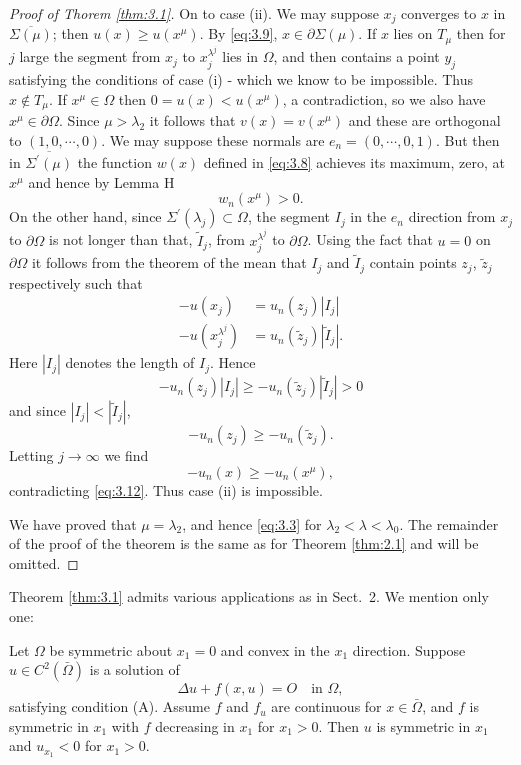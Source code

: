 \begin{proof}[Proof of Thorem \ref{thm:3.1}]
  On to case (ii). We may suppose $x_j$ converges to $x$ in $\overline{\Sigma(\mu)}$; then $u(x) \geq  u(x^{\mu})$. By \eqref{eq:3.9}, $x\in\partial\Sigma(\mu)$. If $x$ lies on $T_{\mu}$ then for $j$ large the segment from $x_j$ to $x_j^{\lambda^j}$ lies in $\Omega$, and then contains a point $y_j$ satisfying the conditions of case (i) - which we know to be impossible. Thus $x\notin T_{\mu}$. If $x^{\mu}\in\Omega$ then $0 = u(x)<u(x^{\mu})$, a contradiction, so we also have $x^{\mu}\in\partial\Omega$. Since $\mu>\lambda_2$ it follows that $v(x)= v(x^{\mu})$ and these are orthogonal to $(1, 0, \cdots, 0)$. We may suppose these normals are $e_n = (0,\cdots ,0, 1)$. But then in $\overline{\Sigma^{\prime}(\mu)}$ the function $w(x)$ defined in \eqref{eq:3.8} achieves its maximum, zero, at $x^{\mu}$ and hence by Lemma H
  \begin{equation}\label{eq:3.12}
    w_n(x^{\mu})>0.
  \end{equation}
  On the other hand, since $\Sigma^{\prime}(\lambda_j)\subset\Omega$, the segment $I_j$ in the $e_n$ direction from $x_j$ to $\partial\Omega$ is not longer than that, $\tilde{I}_j$, from $x_j^{\lambda^j}$ to $\partial\Omega$. Using the fact that $u = 0$ on $\partial\Omega$ it follows from the theorem of the mean that $I_j$ and $\tilde{I}_j$ contain points $z_j$, $\tilde{z}_j$ respectively such that
  \[ \begin{aligned}
    -u(x_j) &= u_n(z_j)|I_j|\\
    -u(x_j^{\lambda^j}) &= u_n(\tilde{z}_j)|\tilde{I}_j|.
  \end{aligned} \]
  Here $|I_j|$ denotes the length of $I_j$. Hence
  \[-u_n(z_j)|I_j|\geq  -u_n(\tilde{z}_j)|\tilde{I}_j| >0\]
  and since $|I_j| < |\tilde{I}_j|$,
  \[-u_n(z_j)\geq  -u_n(\tilde{z}_j).\]
  Letting $j\rightarrow\infty$ we find
  \[-u_n(x)\geq  -u_n(x^{\mu}),\]
  contradicting \eqref{eq:3.12}. Thus case (ii) is impossible.
  
  We have proved that $\mu=\lambda_2$, and hence \eqref{eq:3.3} for $\lambda_2<\lambda<\lambda_0$. 
  The remainder of the proof of the theorem is the same as for Theorem \ref{thm:2.1}
  and will be omitted.
\end{proof}

Theorem \ref{thm:3.1} admits various applications as in Sect.~2. We mention only one:
\setcounter{corollary}{0}
\begin{corollary}
  Let $\Omega$ be symmetric about $x_1 = 0$ and convex in the $x_1$ direction.
  Suppose $u\in C^2(\bar{\Omega})$ is a solution of
  \[ \Delta u+ f(x,u)=O \quad\text{in }\Omega, \]
  satisfying condition (A). Assume $f$ and $f_u$ are continuous for $x\in\bar{\Omega}$, 
  and $f$ is symmetric in $x_1$ with $f$ decreasing in $x_1$ for $x_1 >0$. 
  Then $u$ is symmetric in $x_1$ and $u_{x_1} <0$ for $x_1>0$.
\end{corollary}

